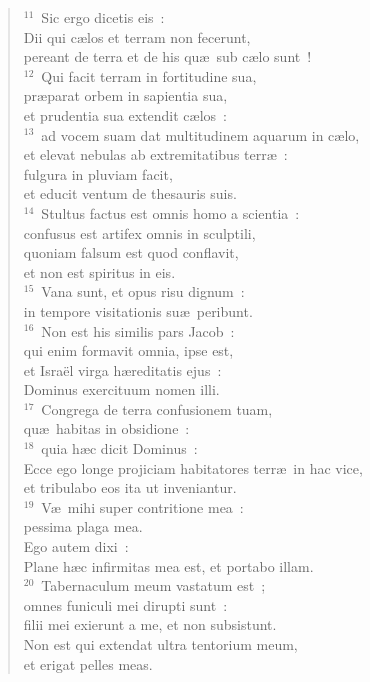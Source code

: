 \begin{flushleft}
\begin{verse}
${}^{11}$~Sic ergo dicetis eis~:\\ Dii qui c\ae los et terram non fecerunt,\\ pereant de terra et de his qu\ae\ sub c\ae lo sunt~!\\
${}^{12}$~Qui facit terram in fortitudine sua,\\ pr\ae parat orbem in sapientia sua,\\ et prudentia sua extendit c\ae los~:\\
${}^{13}$~ad vocem suam dat multitudinem aquarum in c\ae lo,\\ et elevat nebulas ab extremitatibus terr\ae~:\\ fulgura in pluviam facit,\\ et educit ventum de thesauris suis.\\
${}^{14}$~Stultus factus est omnis homo a scientia~:\\ confusus est artifex omnis in sculptili,\\ quoniam falsum est quod conflavit,\\ et non est spiritus in eis.\\
${}^{15}$~Vana sunt, et opus risu dignum~:\\ in tempore visitationis su\ae\ peribunt.\\
${}^{16}$~Non est his similis pars Jacob~:\\ qui enim formavit omnia, ipse est,\\ et Isra\"el virga h\ae reditatis ejus~:\\ Dominus exercituum nomen illi.\\
${}^{17}$~Congrega de terra confusionem tuam,\\ qu\ae\ habitas in obsidione~:\\
${}^{18}$~quia h\ae c dicit Dominus~:\\ Ecce ego longe projiciam habitatores terr\ae\ in hac vice,\\ et tribulabo eos ita ut inveniantur.\\
${}^{19}$~V\ae\ mihi super contritione mea~:\\ pessima plaga mea.\\ Ego autem dixi~:\\ Plane h\ae c infirmitas mea est, et portabo illam.\\
${}^{20}$~Tabernaculum meum vastatum est~;\\ omnes funiculi mei dirupti sunt~:\\ filii mei exierunt a me, et non subsistunt.\\ Non est qui extendat ultra tentorium meum,\\ et erigat pelles meas.\\

\end{verse}
\end{flushleft}
